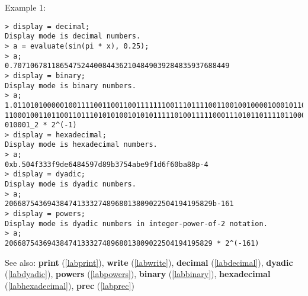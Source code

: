 \noindent Example 1: 
\begin{center}\begin{minipage}{15cm}\begin{Verbatim}[frame=single]
> display = decimal;
Display mode is decimal numbers.
> a = evaluate(sin(pi * x), 0.25);
> a;
0.707106781186547524400844362104849039284835937688449
> display = binary;
Display mode is binary numbers.
> a;
1.011010100000100111100110011001111111001110111100110010010000100010110010111110
11000100110110011011101010100101010111110100111110001110101101111011000001011101
010001_2 * 2^(-1)
> display = hexadecimal;
Display mode is hexadecimal numbers.
> a;
0xb.504f333f9de6484597d89b3754abe9f1d6f60ba88p-4
> display = dyadic;
Display mode is dyadic numbers.
> a;
2066875436943847413332748968013809022504194195829b-161
> display = powers;
Display mode is dyadic numbers in integer-power-of-2 notation.
> a;
2066875436943847413332748968013809022504194195829 * 2^(-161)
\end{Verbatim}
\end{minipage}\end{center}
See also: \textbf{print} (\ref{labprint}), \textbf{write} (\ref{labwrite}), \textbf{decimal} (\ref{labdecimal}), \textbf{dyadic} (\ref{labdyadic}), \textbf{powers} (\ref{labpowers}), \textbf{binary} (\ref{labbinary}), \textbf{hexadecimal} (\ref{labhexadecimal}), \textbf{prec} (\ref{labprec})

